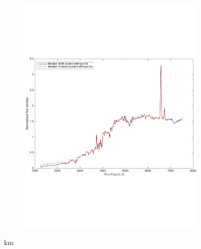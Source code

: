 \begin{figure}
\begin{subfigure}[b]{0.5\textwidth}
                    \centering \includegraphics[width=\textwidth]{k_means_images/Sa_comp.pdf}
                \end{subfigure}
                \caption{km}
                 \label{fig: som_k_means_comp}
\end{figure}
